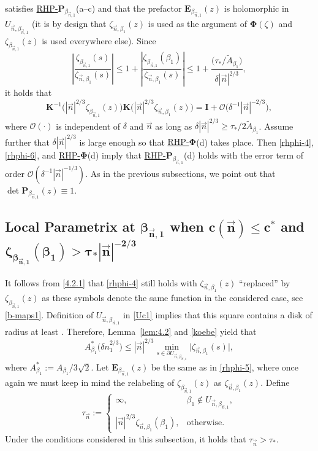\documentclass[pdftex]{sigma}
\numberwithin{equation}{section}
\renewcommand{\det}{\operatorname{det}}
\newcommand{\n}{{\vec n}}
\newcommand{\rhp} {\textnormal{RHP}-${\boldsymbol P}$}
\newcommand{\rhphi} {\textnormal{RHP}-${\boldsymbol \Phi}$}
\begin{document}
satisfies \hyperref[rhp]{\rhp$_{\beta_{\n,1}}$}(a--c) and that the prefactor $\boldsymbol E_{\beta_{\n,1}}(z)$ is holomorphic in $ U_{\n,\beta_{\n,1}} $ (it is by design that $ \zeta_{\n,\beta_1}(z) $ is used as the argument of $ \boldsymbol \Phi(\zeta) $ and $ \zeta_{\beta_{\n,1}}(z) $ is used everywhere else). Since
\[
\left|\frac{\zeta_{\beta_{\n,1}}(s)}{\zeta_{\n,\beta_1}(s)}\right| \leq 1+ \left|\frac{\zeta_{\beta_{\n,1}}(\beta_1)}{\zeta_{\n,\beta_1}(s)}\right| \leq 1 + \frac{\bigl(\tau_*/\tilde A_{\beta_1}\bigr)}{\delta|\n|^{2/3}},
\]
it holds that
\[
\boldsymbol K^{-1} \bigl(|\n|^{2/3}\zeta_{\beta_{\n,1}}(z)\bigr)\boldsymbol K \bigl(|\n|^{2/3}\zeta_{\n,\beta_1}(z)\bigr) = \boldsymbol I + \boldsymbol{\mathcal O}\bigl( \delta^{-1}|\n|^{-2/3} \bigr),
\]
where $ \boldsymbol{\mathcal O}(\cdot) $ is independent of $ \delta $ and $ \n $ as long as $ \delta |\n|^{2/3} \geq \tau_*/2\tilde A_{\beta_1} $. Assume further that $ \delta |\n|^{2/3} $ is large enough so that \hyperref[rhphi]{\rhphi}(d) takes place. Then \eqref{rhphi-4}, \eqref{rhphi-6}, and \hyperref[rhphi]{\rhphi}(d) imply that \hyperref[rhp]{\rhp$_{\beta_{\n,1}}$}(d) holds with the error term of order $ \boldsymbol{\mathcal O}\left(\delta^{-1} |\n|^{-1/3} \right) $. As in the previous subsections, we point out that $ \det \boldsymbol P_{\beta_{\n,1}}(z) \equiv 1 $.


\subsection[Local parametrix at beta\_n,1 when c(n)leq c\^{}* and zeta\_beta\_n,1(beta\_1)]{Local Parametrix at $ \boldsymbol{\beta_{\n,1}} $ when $ \boldsymbol{c(\n)\leq c^* }$ and $ \boldsymbol{\zeta_{\beta_{\n,1}}(\beta_1) > \tau_* |\n|^{-2/3}} $}
\label{ss:65}

It follows from \eqref{4.2.1} that \eqref{rhphi-4} still holds with $ \zeta_{\n,\beta_1}(z) $ ``replaced'' by $ \zeta_{\beta_{\n,1}}(z) $ as these symbols denote the same function in the considered case, see \eqref{b-maps1}. Definition of $ U_{\n,\beta_{\n,1}} $ in \eqref{Uc1} implies that this square contains a disk of radius at least \smash{$ \delta c(\n)/3\sqrt 2 $}. Therefore, Lemma~\ref{lem:4.2} and \eqref{koebe} yield that
\begin{equation}
\label{rhth-1}
A_{\beta_1}^* \bigl(\delta n_1^{2/3}\bigr) \leq |\n|^{2/3} \min_{s\in\partial U_{\n,\beta_{\n,1}}} \big|\zeta_{\n,\beta_1}(s) \big|,
\end{equation}
where $ A_{\beta_1}^*:=A_{\beta_1}/3\sqrt2 $. Let $ \boldsymbol E_{\beta_{\n,1}}(z) $ be the same as in \eqref{rhphi-5}, where once again we must keep in mind the relabeling of $ \zeta_{\beta_{\n,1}}(z) $ as $ \zeta_{\n,\beta_1}(z) $. Define
\[
\tau_\n := \begin{cases}
 \infty, & \beta_1 \not\in U_{\n,\beta_{\n,1}}, \\
 |\n|^{2/3} \zeta_{\n,\beta_1}(\beta_1), & \text{otherwise}.
 \end{cases}
\]
Under the conditions considered in this subsection, it holds that $ \tau_\n>\tau_* $.
\end{document}
